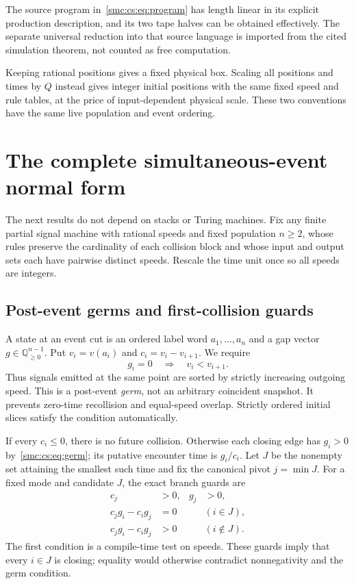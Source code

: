 \documentclass[11pt,letterpaper]{article}
\numberwithin{equation}{section}
\theoremstyle{definition}
\theoremstyle{remark}
\newcommand{\Q}{\mathbb Q}
\begin{document}
The source program in~\eqref{smc:cs:eq:program} has length linear in its explicit production description, and its two tape halves can be obtained effectively. The separate universal reduction into that source language is imported from the cited simulation theorem, not counted as free computation.

Keeping rational positions gives a fixed physical box. Scaling all positions and times by $Q$ instead gives integer initial positions with the same fixed speed and rule tables, at the price of input-dependent physical scale. These two conventions have the same live population and event ordering.

\section{The complete simultaneous-event normal form}\label{smc:cs:sec:event}
The next results do not depend on stacks or Turing machines. Fix any finite partial signal machine with rational speeds and fixed population $n\ge2$, whose rules preserve the cardinality of each collision block and whose input and output sets each have pairwise distinct speeds. Rescale the time unit once so all speeds are integers.

\subsection{Post-event germs and first-collision guards}
A state at an event cut is an ordered label word $a_1,\ldots,a_n$ and a gap vector $g\in\Q_{\ge0}^{n-1}$. Put $v_i=v(a_i)$ and $c_i=v_i-v_{i+1}$. We require
\begin{equation}\label{smc:cs:eq:germ}
 g_i=0\quad\Longrightarrow\quad v_i<v_{i+1}.
\end{equation}
Thus signals emitted at the same point are sorted by strictly increasing outgoing speed. This is a post-event \emph{germ}, not an arbitrary coincident snapshot. It prevents zero-time recollision and equal-speed overlap. Strictly ordered initial slices satisfy the condition automatically.

If every $c_i\le0$, there is no future collision. Otherwise each closing edge has $g_i>0$ by~\eqref{smc:cs:eq:germ}; its putative encounter time is $g_i/c_i$. Let $J$ be the nonempty set attaining the smallest such time and fix the canonical pivot $j=\min J$. For a fixed mode and candidate $J$, the exact branch guards are
\begin{align}
 c_j&>0,&g_j&>0,\label{smc:cs:eq:guards1}\\
 c_jg_i-c_ig_j&=0&&(i\in J),\label{smc:cs:eq:guards2}\\
 c_jg_i-c_ig_j&>0&&(i\notin J).\label{smc:cs:eq:guards3}
\end{align}
The first condition is a compile-time test on speeds. These guards imply that every $i\in J$ is closing; equality would otherwise contradict nonnegativity and the germ condition.
\end{document}
